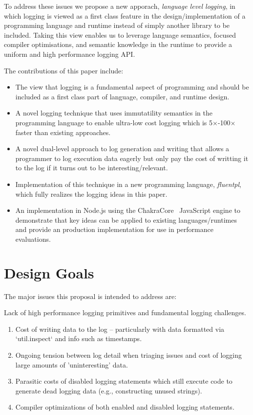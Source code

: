 \documentclass[twocolumn,10pt]{article}
\begin{document}
To address these issues we propose a new apporach, \emph{language level
logging}, in which logging is viewed as a first class feature in the
design/implementation of a programming language and runtime instead of simply
another library to be included. Taking this view enables us to leverage language
semantics, focused compiler optimisations, and semantic knowledge in the runtime
to provide a uniform and high performance logging API.

\noindent
The contributions of this paper include:
\begin{itemize}
\item The view that logging is a fundamental aspect of programming and should be
included as a first class part of language, compiler, and runtime design.

\item A novel logging technique that uses immutatility semantics in the
programming language to enable ultra-low cost logging which is
5$\times$-100$\times$ faster than existing approaches.

\item A novel dual-level approach to log generation and writing that allows a
programmer to log execution data eagerly but only pay the cost of writting it to
the log if it turns out to be interesting/relevant.

\item Implementation of this technique in a new programming language,
\emph{fluentpl}, which fully realizes the logging ideas in this paper. 

\item An implementation in Node.js using the ChakraCore~\cite{NodeChakraCore}
JavaScript engine to demonstrate that key ideas can be applied to existing
languages/runtimes and provide an production implementation for use in
performance evaluations.
\end{itemize}

\section{Design Goals}

The major issues this proposal is intended to address are:

\noindent
Lack of high performance logging primitives and fundamental logging challenges.
\begin{enumerate}
 \item Cost of writing data to the log -- particularly with data formatted via 
    `util.inspect` and info such as timestamps.
 \item Ongoing tension between log detail when triaging issues and cost of logging 
    large amounts of 'uninteresting' data.
\item Parasitic costs of disabled logging statements which still execute code to 
    generate dead logging data (e.g., constructing unused strings).
\item Compiler optimizations of both enabled and disabled logging statements.
\end{enumerate}
\end{document}

